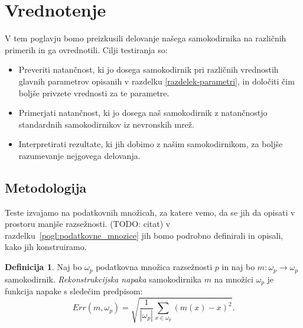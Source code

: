 \documentclass[12pt,a4paper,twoside]{article}
\theoremstyle{definition} %
\newtheorem{definicija}{Definicija}[section]
\theoremstyle{plain} %
\numberwithin{equation}{section}  %
\begin{document}


\section{Vrednotenje}
\label{pogl:vrednotenje}

V tem poglavju bomo preizkusili delovanje našega samokodirnika na različnih primerih in ga ovrednotili.
Cilji testiranja so:
\begin{itemize}
	\item Preveriti natančnost, ki jo dosega samokodirnik pri različnih vrednostih glavnih parametrov opisanih v razdelku \ref{razdelek-parametri}, 
	in določiti čim boljše privzete vrednosti za te parametre.

	\item Primerjati natančnost, ki jo dosega naš samokodirnik z natančnostjo standardnih samokodirnikov iz nevronskih mrež.

	\item Interpretirati rezultate, ki jih dobimo z našim samokodirnikom, za boljše razumevanje nejgovega delovanja.
\end{itemize}


\subsection{Metodologija}

Teste izvajamo na podatkovnih množicah, za katere vemo, da se jih da opisati v prostoru manjše razsežnosti. (TODO: citat) %
v razdelku~\ref{pogl:podatkovne_mnozice} jih bomo podrobno definirali in opisali, kako jih konstruiramo.


\begin{definicija}
	Naj bo $\omega_p$ podatkovna množica razsežnosti $p$ in naj bo $m: \omega_p \rightarrow \omega_p$ samokodirnik.
	\emph{Rekonstrukcijska napaka} samokodirnika $m$ na množici $\omega_p$ je funkcija napake s sledečim predpisom:
	\[
		Err(m,\omega_p) = \sqrt{\frac{1}{|\omega_p|} \sum_{x \in \omega_p} (m(x)-x)^2}.
	\]
\end{definicija}	
\end{document}
